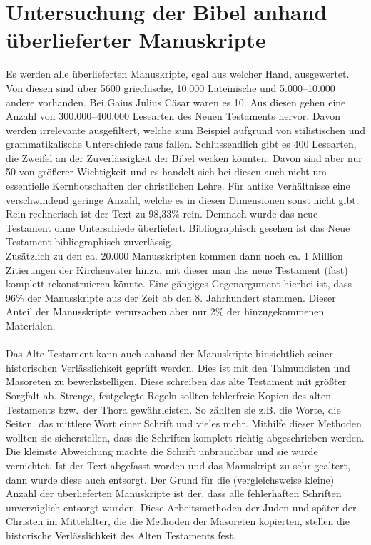 \chapter{Untersuchung der Bibel anhand überlieferter Manuskripte}
Es werden alle überlieferten Manuskripte, egal aus welcher Hand, ausgewertet. Von diesen sind über 5600 griechische, 10.000 Lateinische und 5.000--10.000 andere vorhanden. Bei Gaius Julius Cäsar waren es 10.  Aus diesen gehen eine Anzahl von 300.000--400.000 Lesearten des Neuen Testaments hervor. Davon werden irrelevante ausgefiltert, welche zum Beispiel aufgrund von stilistischen und grammatikalische Unterschiede raus fallen. Schlussendlich gibt es 400 Lesearten, die Zweifel an der Zuverlässigkeit der Bibel wecken könnten. Davon sind aber nur 50 von größerer Wichtigkeit und es handelt sich bei diesen auch nicht um essentielle Kernbotschaften der christlichen Lehre. Für antike Verhältnisse eine verschwindend geringe Anzahl, welche es in diesen Dimensionen sonst nicht gibt. Rein rechnerisch ist der Text zu 98,33\% rein. Demnach wurde das neue Testament ohne Unterschiede überliefert. Bibliographisch gesehen ist das Neue Testament bibliographisch zuverlässig.
\\
Zusätzlich zu den ca. 20.000 Manusskripten kommen dann noch ca. 1 Million Zitierungen der Kirchenväter hinzu, mit dieser man das neue Testament (fast) komplett rekonstruieren könnte. Eine gängiges Gegenargument hierbei ist, dass 96\% der Manusskripte aus der Zeit ab den 8. Jahrhundert stammen. Dieser Anteil der Manusskripte verursachen aber nur 2\% der hinzugekommenen Materialen.
\\~\\
Das Alte Testament kann auch anhand der Manuskripte hinsichtlich seiner historischen Verlässlichkeit geprüft werden. Dies ist mit den Talmundisten und Masoreten zu bewerkstelligen. Diese schreiben das alte Testament mit größter Sorgfalt ab. Strenge, festgelegte Regeln sollten fehlerfreie Kopien des alten Testaments bzw.\ der Thora gewährleisten. So zählten sie z.B. die Worte, die Seiten, das mittlere Wort einer Schrift und vieles mehr. Mithilfe dieser Methoden wollten sie sicherstellen, dass die Schriften komplett richtig abgeschrieben werden. Die kleinste Abweichung machte die Schrift unbrauchbar und sie wurde vernichtet. Ist der Text abgefasst worden und das Manuskript zu sehr gealtert, dann wurde diese auch entsorgt. Der Grund für die (vergleichsweise kleine) Anzahl der überlieferten Manuskripte ist der, dass alle fehlerhaften Schriften unverzüglich entsorgt wurden. Diese Arbeitsmethoden der Juden und später der Christen im Mittelalter, die die Methoden der Masoreten kopierten, stellen die historische Verlässlichkeit des Alten Testaments fest.

